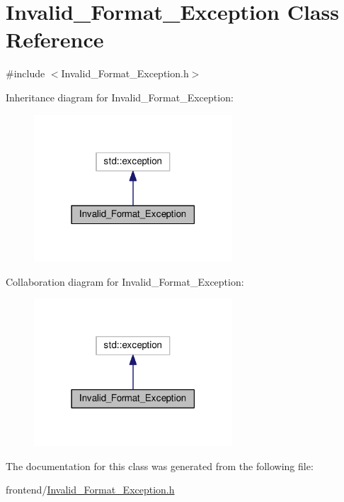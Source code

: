 \hypertarget{classInvalid__Format__Exception}{\section{Invalid\-\_\-\-Format\-\_\-\-Exception Class Reference}
\label{classInvalid__Format__Exception}
}


{\ttfamily \#include $<$Invalid\-\_\-\-Format\-\_\-\-Exception.\-h$>$}



Inheritance diagram for Invalid\-\_\-\-Format\-\_\-\-Exception\-:
\nopagebreak
\begin{figure}[H]
\begin{center}
\leavevmode
\includegraphics[width=210pt]{classInvalid__Format__Exception__inherit__graph}
\end{center}
\end{figure}


Collaboration diagram for Invalid\-\_\-\-Format\-\_\-\-Exception\-:
\nopagebreak
\begin{figure}[H]
\begin{center}
\leavevmode
\includegraphics[width=210pt]{classInvalid__Format__Exception__coll__graph}
\end{center}
\end{figure}


The documentation for this class was generated from the following file\-:\begin{DoxyCompactItemize}
\item 
frontend/\hyperlink{Invalid__Format__Exception_8h}{Invalid\-\_\-\-Format\-\_\-\-Exception.\-h}\end{DoxyCompactItemize}
